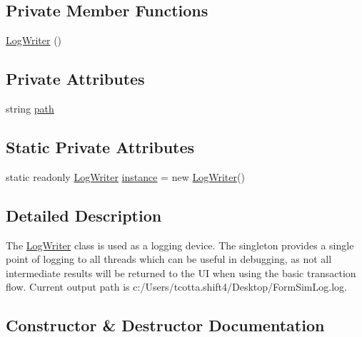 \subsection*{Private Member Functions}
\begin{DoxyCompactItemize}
\item 
\mbox{\hyperlink{class_form_sim_1_1_log_writer_af6cb07c1c0002786e836f8f36526eb74}{Log\+Writer}} ()
\end{DoxyCompactItemize}
\subsection*{Private Attributes}
\begin{DoxyCompactItemize}
\item 
string \mbox{\hyperlink{class_form_sim_1_1_log_writer_ac5a2e70a6686c89095cb405bb5b5c7ea}{path}}
\end{DoxyCompactItemize}
\subsection*{Static Private Attributes}
\begin{DoxyCompactItemize}
\item 
static readonly \mbox{\hyperlink{class_form_sim_1_1_log_writer}{Log\+Writer}} \mbox{\hyperlink{class_form_sim_1_1_log_writer_aa018a2effe4cf7a046fd44fe337386aa}{instance}} = new \mbox{\hyperlink{class_form_sim_1_1_log_writer}{Log\+Writer}}()
\end{DoxyCompactItemize}


\subsection{Detailed Description}
The \mbox{\hyperlink{class_form_sim_1_1_log_writer}{Log\+Writer}} class is used as a logging device. The singleton provides a single point of logging to all threads which can be useful in debugging, as not all intermediate results will be returned to the UI when using the basic transaction flow. Current output path is c\+:/\+Users/tcotta.shift4/\+Desktop/\+Form\+Sim\+Log.\+log. 



\subsection{Constructor \& Destructor Documentation}
\mbox{\label{class_form_sim_1_1_log_writer_af6cb07c1c0002786e836f8f36526eb74}} 
